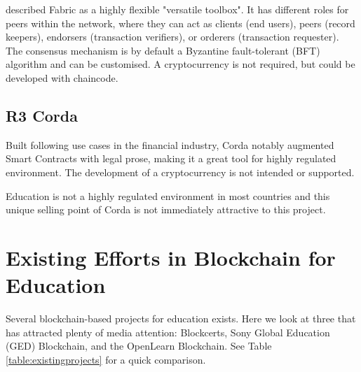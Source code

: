 \citet[p.7]{valenta2017comparison} described Fabric as a highly flexible "versatile toolbox". It
has different roles for peers within the network, where they can act as clients (end users), peers
(record keepers), endorsers (transaction verifiers), or orderers (transaction requester). The
consensus mechanism is by default a Byzantine fault-tolerant (BFT) algorithm and can be customised.
A cryptocurrency is not required, but could be developed with chaincode.

\subsection*{R3 Corda}

Built following use cases in the financial industry, Corda notably augmented Smart Contracts
with legal prose, making it a great tool for highly regulated environment. The development of
a cryptocurrency is not intended or supported. \citep{valenta2017comparison}

Education is not a highly regulated environment in most countries and this unique selling point of
Corda is not immediately attractive to this project.

\section{Existing Efforts in Blockchain for Education}


Several blockchain-based projects for education exists. Here we look at three that has attracted plenty of media attention:
Blockcerts, Sony Global Education (GED) Blockchain, and the OpenLearn Blockchain. See Table \ref{table:existingprojects} for a quick comparison.

